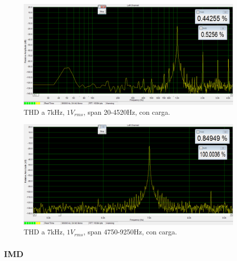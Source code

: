 \begin{figure}[H]
\centering
\includegraphics[width=\textwidth]{img/Distorsion/THD_1k_1V_carga_span_20_4520.png}
\caption{THD a 7kHz, $1V_{rms}$, span 20-4520Hz, con carga.}
\label{THD7} 
\end{figure}

\begin{figure}[H]
\centering
\includegraphics[width=\textwidth]{img/Distorsion/THD_7k_1V_carga_span_4750_9250.png}
\caption{THD a 7kHz, $1V_{rms}$, span 4750-9250Hz, con carga.}
\label{THD8} 
\end{figure}

\subsubsection*{IMD}